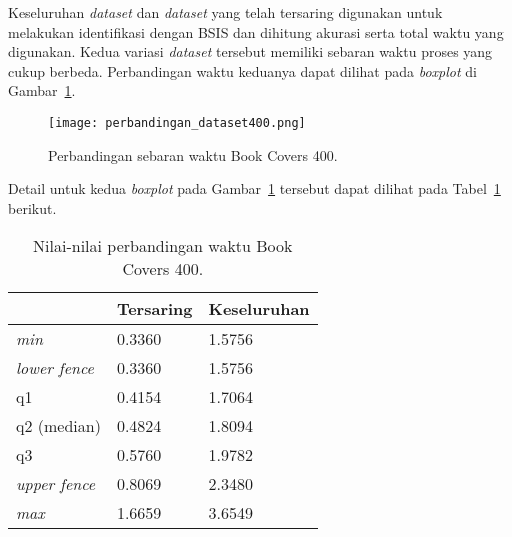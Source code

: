 
Keseluruhan \textit{dataset} dan \textit{dataset} yang telah tersaring digunakan untuk melakukan identifikasi dengan BSIS dan dihitung akurasi serta total waktu yang digunakan. Kedua variasi \textit{dataset} tersebut memiliki sebaran waktu proses yang cukup berbeda. Perbandingan waktu keduanya dapat dilihat pada \textit{boxplot} di Gambar~\ref{fig:perbandingan_dataset400}.

\begin{figure}[H]
	\centering
	\texttt{[image: perbandingan\_dataset400.png]}
	\caption{Perbandingan sebaran waktu Book Covers 400.}
	\label{fig:perbandingan_dataset400}
\end{figure}

Detail untuk kedua \textit{boxplot} pada Gambar~\ref{fig:perbandingan_dataset400} tersebut dapat dilihat pada Tabel~\ref{tab:perbandingan_dataset400} berikut.
\begin{table}[H]
	\centering
	\begin{tabular}{|l|l|l|}
		\hline
		& \textbf{Tersaring} & \textbf{Keseluruhan} \\ \hline
		\textit{min}         & 0.3360            & 1.5756              \\ \hline
		\textit{lower fence} & 0.3360            & 1.5756              \\ \hline
		q1                   & 0.4154            & 1.7064              \\ \hline
		q2 (median)          & 0.4824            & 1.8094              \\ \hline
		q3                   & 0.5760            & 1.9782              \\ \hline
		\textit{upper fence} & 0.8069            & 2.3480              \\ \hline
		\textit{max}         & 1.6659            & 3.6549              \\ \hline
	\end{tabular}
	\caption{Nilai-nilai perbandingan waktu Book Covers 400.}
	\label{tab:perbandingan_dataset400}
\end{table}

